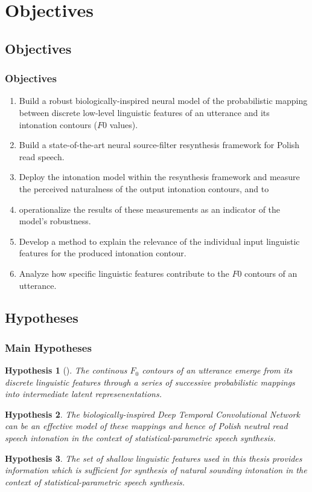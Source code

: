 \documentclass[a4paper,9pt]{beamer}
\theoremstyle{mytheoremstyle}
\newtheorem{hypothesis}{Hypothesis}
\begin{document}
\section{Objectives}
\subsection{Objectives}
\begin{frame}
\frametitle{Objectives}
\begin{enumerate}
\item<1-2> Build a robust biologically-inspired neural model of the probabilistic mapping between discrete low-level linguistic features of an utterance and its intonation contours ($F0$ values).
\item<2> Build a state-of-the-art neural source-filter resynthesis framework for Polish read speech.
\item<2> Deploy the intonation model within the resynthesis framework and measure the perceived naturalness of the output intonation contours, and to
\item<2> operationalize the results of these measurements as an indicator of the model's robustness.
\item<2> Develop a method to explain the relevance of the individual input linguistic features for the produced intonation contour.
\item<1-2> Analyze how specific linguistic features contribute to the $F0$ contours of an utterance.
\end{enumerate}
\end{frame}

\subsection{Hypotheses}
\begin{frame}
\frametitle{Main Hypotheses}
\begin{tcolorbox}
\begin{hypothesis}[] The continous $F_0$ contours of an utterance emerge from its discrete linguistic features through a series of successive probabilistic mappings into intermediate latent represenentations.
\end{hypothesis}
\begin{hypothesis}
The biologically-inspired Deep Temporal Convolutional Network can be an effective model of these mappings and hence of Polish neutral read speech intonation in the context of statistical-parametric speech synthesis. \label{secondary:a}
\end{hypothesis}
\begin{hypothesis}
The set of shallow linguistic features used in this thesis provides information which is sufficient for synthesis of natural sounding intonation in the context of statistical-parametric speech synthesis. \label{secondary:b}
\end{hypothesis}
\end{tcolorbox}
\end{frame}
\end{document}
